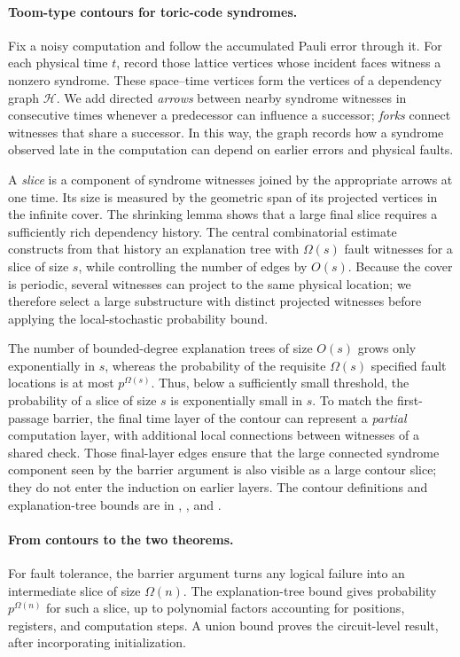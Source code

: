 \paragraph{Toom-type contours for toric-code syndromes.}
Fix a noisy computation and follow the accumulated Pauli error through it.  For each physical time $t$, record those lattice vertices whose incident faces witness a nonzero syndrome.  These space--time vertices form the vertices of a dependency graph $\mathcal H$.  We add directed \emph{arrows} between nearby syndrome witnesses in consecutive times whenever a predecessor can influence a successor; \emph{forks} connect witnesses that share a successor.  In this way, the graph records how a syndrome observed late in the computation can depend on earlier errors and physical faults.



A \emph{slice} is a component of syndrome witnesses joined by the appropriate arrows at one time.  Its size is measured by the geometric span of its projected vertices in the infinite cover.  The shrinking lemma shows that a large final slice requires a sufficiently rich dependency history.  The central combinatorial estimate constructs from that history an explanation tree with $\Omega(s)$ fault witnesses for a slice of size $s$, while controlling the number of edges by $O(s)$.  Because the cover is periodic, several witnesses can project to the same physical location; we therefore select a large substructure with distinct projected witnesses before applying the local-stochastic probability bound.

The number of bounded-degree explanation trees of size $O(s)$ grows only exponentially in $s$, whereas the probability of the requisite $\Omega(s)$ specified fault locations is at most $p^{\Omega(s)}$.  Thus, below a sufficiently small threshold, the probability of a slice of size $s$ is exponentially small in $s$.  To match the first-passage barrier, the final time layer of the contour can represent a \emph{partial} computation layer, with additional local connections between witnesses of a shared check.  Those final-layer edges ensure that the large connected syndrome component seen by the barrier argument is also visible as a large contour slice; they do not enter the induction on earlier layers.  The contour definitions and explanation-tree bounds are in , , and .

\paragraph{From contours to the two theorems.}
For fault tolerance, the barrier argument turns any logical failure into an intermediate slice of size $\Omega(n)$.  The explanation-tree bound gives probability $p^{\Omega(n)}$ for such a slice, up to polynomial factors accounting for positions, registers, and computation steps.  A union bound proves the circuit-level result, after incorporating initialization.

